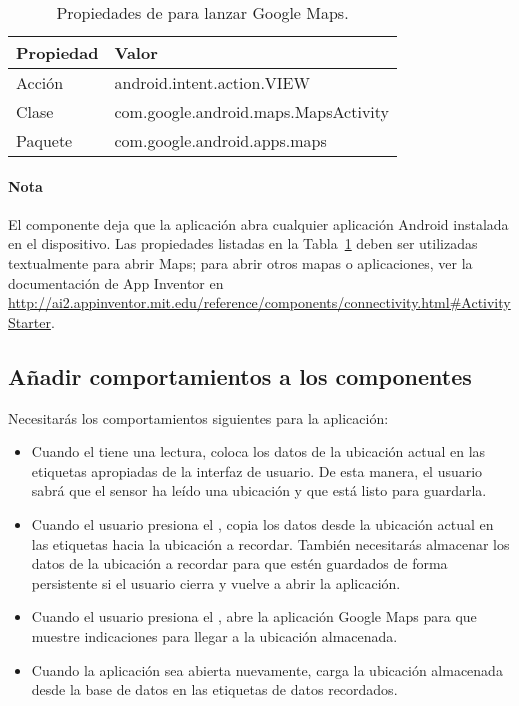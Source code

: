 \begin{table}
\centering
\begin{footnotesize}
\begin{tabular}{|l|p{7cm}|}
\hline
Propiedad & Valor \\\hline
Acción & android.intent.action.VIEW \\\hline
Clase & com.google.android.maps.MapsActivity \\\hline
Paquete & com.google.android.apps.maps \\\hline
\end{tabular}
\end{footnotesize}
\caption{Propiedades de  para lanzar Google Maps.}
\label{tab:Sensors2}
\end{table}

\paragraph{Nota} El componente  deja que la
aplicación abra cualquier aplicación Android instalada en el
dispositivo. Las propiedades listadas en la Tabla~\ref{tab:Sensors2}
deben ser utilizadas textualmente para abrir Maps; para abrir otros
mapas o aplicaciones, ver la documentación de App Inventor en
\url{http://ai2.appinventor.mit.edu/reference/components/connectivity.html#ActivityStarter}.

\subsection*{Añadir comportamientos a los componentes}

{Necesitarás los comportamientos siguientes para la aplicación:}

\begin{itemize}
\item Cuando el  tiene una lectura,
  coloca los datos de la ubicación actual en las etiquetas apropiadas
  de la interfaz de usuario. De esta manera, el usuario sabrá que el
  sensor ha leído una ubicación y que está listo para guardarla.

\item Cuando el usuario presiona el , copia
  los datos desde la ubicación actual en las etiquetas hacia la ubicación
  a recordar. También necesitarás almacenar los datos de la ubicación a
  recordar para que estén guardados de forma persistente si el usuario
  cierra y vuelve a abrir la aplicación.

\item Cuando el usuario presiona el
  , abre la aplicación Google Maps
  para que muestre indicaciones para llegar a la ubicación almacenada.

\item Cuando la aplicación sea abierta nuevamente, carga la ubicación
  almacenada desde la base de datos en las etiquetas de datos recordados.
\end{itemize}


